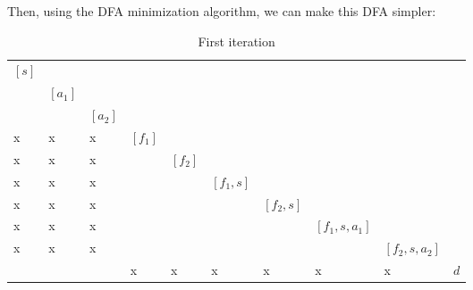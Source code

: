 \documentclass{article}
\theoremstyle{definition}
\begin{document}
\begin{enumerate}
\begin{enumerate}
	Then, using the DFA minimization algorithm, we can make this DFA simpler:
	\begin{table}[H]
		\centering
		
		\label{my-label3}
		\begin{tabular}{llllllllll}
			$[s]$ &         &         &         &         &           &           &               &               &     \\
			& $[a_1]$ &         &         &         &           &           &               &               &     \\
			&         & $[a_2]$ &         &         &           &           &               &               &     \\
			x     & x       & x       & $[f_1]$ &         &           &           &               &               &     \\
			x     & x       & x       &         & $[f_2]$ &           &           &               &               &     \\
			x     & x       & x       &         &         & $[f_1,s]$ &           &               &               &     \\
			x     & x       & x       &         &         &           & $[f_2,s]$ &               &               &     \\
			x     & x       & x       &         &         &           &           & $[f_1,s,a_1]$ &               &     \\
			x     & x       & x       &         &         &           &           &               & $[f_2,s,a_2]$ &     \\
			&         &         & x       & x       & x         & x         & x             & x             & $d$
		\end{tabular}
	\caption{First iteration}
	\end{table}


\end{enumerate}
\end{enumerate}
\end{document}
